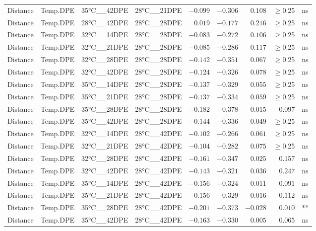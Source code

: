 \documentclass[
]{article}
\begin{document}
\begin{longtable}{llllrrrrl}
Distance & Temp.DPE & 35°C\_\_42DPE & 28°C\_\_21DPE & $-0.099$ & $-0.306$ & $0.108$ & $\geq$0.25 & ns \\ 
Distance & Temp.DPE & 28°C\_\_42DPE & 28°C\_\_28DPE & $0.019$ & $-0.177$ & $0.216$ & $\geq$0.25 & ns \\ 
Distance & Temp.DPE & 32°C\_\_14DPE & 28°C\_\_28DPE & $-0.083$ & $-0.272$ & $0.106$ & $\geq$0.25 & ns \\ 
Distance & Temp.DPE & 32°C\_\_21DPE & 28°C\_\_28DPE & $-0.085$ & $-0.286$ & $0.117$ & $\geq$0.25 & ns \\ 
Distance & Temp.DPE & 32°C\_\_28DPE & 28°C\_\_28DPE & $-0.142$ & $-0.351$ & $0.067$ & $\geq$0.25 & ns \\ 
Distance & Temp.DPE & 32°C\_\_42DPE & 28°C\_\_28DPE & $-0.124$ & $-0.326$ & $0.078$ & $\geq$0.25 & ns \\ 
Distance & Temp.DPE & 35°C\_\_14DPE & 28°C\_\_28DPE & $-0.137$ & $-0.329$ & $0.055$ & $\geq$0.25 & ns \\ 
Distance & Temp.DPE & 35°C\_\_21DPE & 28°C\_\_28DPE & $-0.137$ & $-0.334$ & $0.059$ & $\geq$0.25 & ns \\ 
Distance & Temp.DPE & 35°C\_\_28DPE & 28°C\_\_28DPE & $-0.182$ & $-0.378$ & $0.015$ & $0.097$ & ns \\ 
Distance & Temp.DPE & 35°C\_\_42DPE & 28°C\_\_28DPE & $-0.144$ & $-0.336$ & $0.049$ & $\geq$0.25 & ns \\ 
Distance & Temp.DPE & 32°C\_\_14DPE & 28°C\_\_42DPE & $-0.102$ & $-0.266$ & $0.061$ & $\geq$0.25 & ns \\ 
Distance & Temp.DPE & 32°C\_\_21DPE & 28°C\_\_42DPE & $-0.104$ & $-0.282$ & $0.075$ & $\geq$0.25 & ns \\ 
Distance & Temp.DPE & 32°C\_\_28DPE & 28°C\_\_42DPE & $-0.161$ & $-0.347$ & $0.025$ & $0.157$ & ns \\ 
Distance & Temp.DPE & 32°C\_\_42DPE & 28°C\_\_42DPE & $-0.143$ & $-0.321$ & $0.036$ & $0.247$ & ns \\ 
Distance & Temp.DPE & 35°C\_\_14DPE & 28°C\_\_42DPE & $-0.156$ & $-0.324$ & $0.011$ & $0.091$ & ns \\ 
Distance & Temp.DPE & 35°C\_\_21DPE & 28°C\_\_42DPE & $-0.156$ & $-0.329$ & $0.016$ & $0.112$ & ns \\ 
Distance & Temp.DPE & 35°C\_\_28DPE & 28°C\_\_42DPE & $-0.201$ & $-0.373$ & $-0.028$ & $0.010$ & ** \\ 
Distance & Temp.DPE & 35°C\_\_42DPE & 28°C\_\_42DPE & $-0.163$ & $-0.330$ & $0.005$ & $0.065$ & ns \\ 

\end{longtable}
\end{document}
